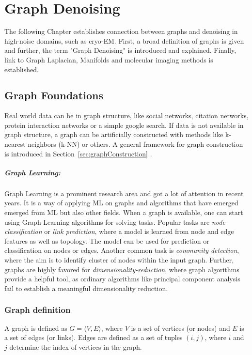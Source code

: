 \chapter{Graph Denoising}
\label{sec:graphFoundations}
    

The following Chapter establishes connection between graphs and denoising in high-noise 
domains, such as cryo-EM.
First, a broad definition of graphs is given and further, the term "Graph Denoising" is
introduced and explained. Finally, link to Graph Laplacian, Manifolds and molecular imaging methods is established.

\section{Graph Foundations}
Real world data can be in graph structure, like social networks, citation networks,
protein interaction networks or a simple google search. 
If data is not available in graph structure, a graph can be artificially constructed with methods like k-nearest neighbors (k-NN) or others.
A general framework for graph construction is introduced in Section~\ref{sec:graphConstruction} \textit{}.

\paragraph{Graph Learning:} Graph Learning is a prominent research area and got a lot of attention in recent years.
It is a way of applying ML on graphs and algorithms that have emerged emerged from ML but also other fields.
When a graph is available, one can start using Graph Learning algorithms for solving tasks.
Popular tasks are \textit{node classification} or \textit{link prediction}, where a model is learned from node and edge features 
as well as topology. The model can be used for prediction or classification on nodes or edges.
Another common task is \textit{community detection}, where the aim is to identify cluster of nodes within the input graph.
Further, graphs are highly favored for \textit{dimensionality-reduction}, where 
graph algorithms provide a helpful tool, as ordinary algorithms like principal component analysis fail to 
establish a meaningful dimensionality reduction.

\subsection{Graph definition}
A graph is defined as $G = \langle V,E \rangle$, where $V$ is a set of 
vertices (or nodes) and $E$ is a set of edges (or links). 
Edges are defined as a set of tuples $(i, j)$, where $i$ and $j$ determine 
the index of vertices in the graph.

